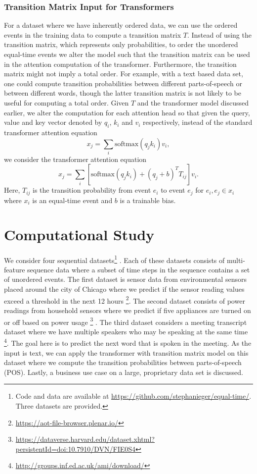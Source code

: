 \documentclass[reqno ,11pt]{article}
\begin{document}
\subsubsection{Transition Matrix Input for Transformers}
For a dataset where we have inherently ordered data, we can use the ordered events in the training data to compute a transition matrix $T$. Instead of using the transition matrix, which represents only probabilities, to order the unordered equal-time events we alter the model such that the transition matrix can be used in the attention computation of the transformer. Furthermore, the transition matrix might not imply a total order. For example, with a text based data set, one could compute transition probabilities between different parts-of-speech or between different words, though the latter transition matrix is not likely to be useful for computing a total order. Given $T$ and the transformer model discussed earlier, we alter the computation for each attention head so that given the query, value and key vector denoted by $q_i$, $k_i$ and $v_i$ respectively, instead of the standard transformer attention equation \[x_j = \sum_i \text{softmax}(q_jk_i)v_i,\] we consider the transformer attention equation \[x_j = \sum_i\left[\text{softmax}(q_jk_i) + (q_j + b)^TT_{ij}\right]v_i.\] Here, $T_{ij}$ is the transition probability from event $e_i$ to event $e_j$ for $e_i, e_j \in x_i$ where $x_i$ is an equal-time event and $b$ is a trainable bias.

\section{Computational Study}
We consider four sequential datasets\footnote{Code and data are available at \href{https://github.com/stephanieger/equal-time/}{\url{https://github.com/stephanieger/equal-time/}}. Three datasets are provided.} . Each of these datasets consists of multi-feature sequence data where a subset of time steps in the sequence contains a set of unordered events. The first dataset is sensor data from environmental sensors placed around the city of Chicago where we predict if the sensor reading values exceed a threshold in the next 12 hours \footnote{\href{https://aot-file-browser.plenar.io/}{\url{https://aot-file-browser.plenar.io/}}}. The second dataset consists of power readings from household sensors where we predict if five appliances are turned on or off based on power usage \footnote{\href{https://dataverse.harvard.edu/dataset.xhtml?persistentId=doi:10.7910/DVN/FIE0S4}{\url{https://dataverse.harvard.edu/dataset.xhtml?persistentId=doi:10.7910/DVN/FIE0S4}}} \cite{AMP}. The third dataset considers a meeting transcript dataset where we have multiple speakers who may be speaking at the same time \footnote{\href{http://groups.inf.ed.ac.uk/ami/download/}{\url{http://groups.inf.ed.ac.uk/ami/download/}}}\cite{AMI}. The goal here is to predict the next word that is spoken in the meeting. As the input is text, we can apply the transformer with transition matrix model on this dataset where we compute the transition probabilities between parts-of-speech (POS). Lastly, a business use case on a large, proprietary data set is discussed. 
\end{document}
